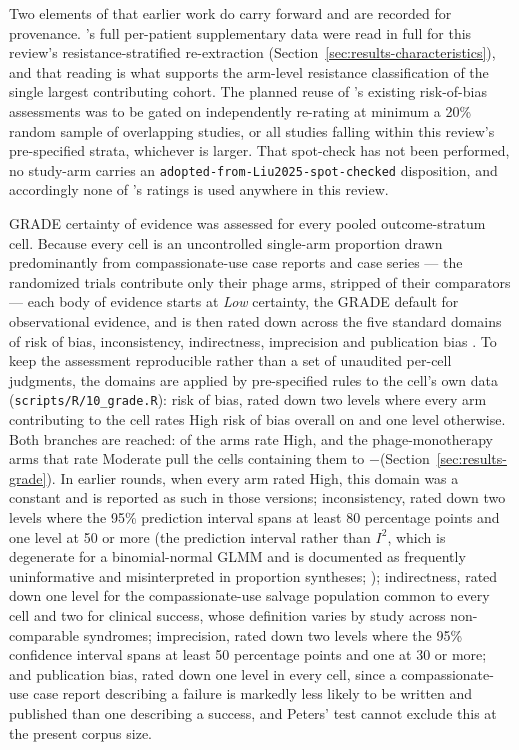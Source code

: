 Two elements of that earlier work do carry forward and are recorded for provenance. \citeauthor{Pirnay2024_natmicrobiol}'s full per-patient supplementary data were read in full for this review's resistance-stratified re-extraction (Section~\ref{sec:results-characteristics}), and that reading is what supports the arm-level resistance classification of the single largest contributing cohort. The planned reuse of \textcite{Liu2025_ijaa}'s existing risk-of-bias assessments was to be gated on independently re-rating at minimum a 20\% random sample of overlapping studies, or all studies falling within this review's pre-specified strata, whichever is larger. That spot-check has not been performed, no study-arm carries an \texttt{adopted-from-Liu2025-spot-checked} disposition, and accordingly none of \citeauthor{Liu2025_ijaa}'s ratings is used anywhere in this review.

 GRADE certainty of evidence \parencite{Guyatt2011_grade} was assessed for every pooled outcome-stratum cell. Because every cell is an uncontrolled single-arm proportion drawn predominantly from compassionate-use case reports and case series --- the randomized trials contribute only their phage arms, stripped of their comparators --- each body of evidence starts at \emph{Low} certainty, the GRADE default for observational evidence, and is then rated down across the five standard domains of risk of bias, inconsistency, indirectness, imprecision and publication bias \parencite{Guyatt2011_grade}. To keep the assessment reproducible rather than a set of unaudited per-cell judgments, the domains are applied by pre-specified rules to the cell's own data (\texttt{scripts/R/10\_grade.R}): risk of bias, rated down two levels where every arm contributing to the cell rates High risk of bias overall on \textcite{Murad2018_casereports} and one level otherwise. Both branches are reached: \RobOverallHigh of the \ArmsAnalysed arms rate High, and the \RobOverallModerate phage-monotherapy arms that rate Moderate pull the cells containing them to $-$\GradeRobDrop  (Section~\ref{sec:results-grade}). In earlier rounds, when every arm rated High, this domain was a constant and is reported as such in those versions; inconsistency, rated down two levels where the 95\% prediction interval spans at least 80 percentage points and one level at 50 or more (the prediction interval rather than $I^2$, which is degenerate for a binomial-normal GLMM and is documented as frequently uninformative and misinterpreted in proportion syntheses; \cite{Migliavaca2022_i2prevalence}); indirectness, rated down one level for the compassionate-use salvage population common to every cell and two for clinical success, whose definition varies by study across non-comparable syndromes; imprecision, rated down two levels where the 95\% confidence interval spans at least 50 percentage points and one at 30 or more; and publication bias, rated down one level in every cell, since a compassionate-use case report describing a failure is markedly less likely to be written and published than one describing a success, and Peters' test cannot exclude this at the present corpus size.

